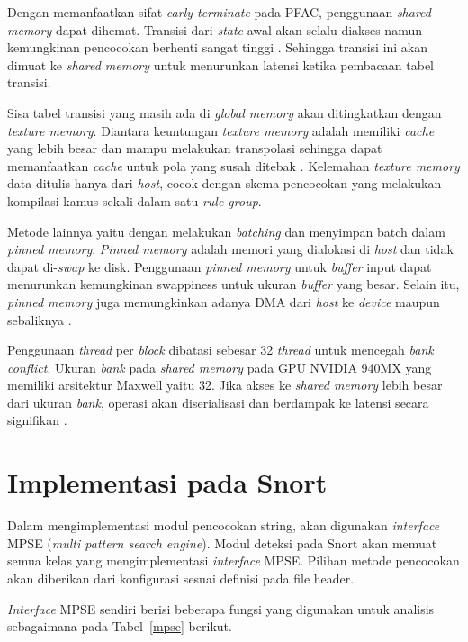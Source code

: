 \documentclass[conference]{IEEEtran}
\begin{document}
        Dengan memanfaatkan sifat \emph{early terminate} pada PFAC, penggunaan \emph{shared memory} dapat dihemat. Transisi dari \emph{state} awal akan selalu diakses namun kemungkinan pencocokan berhenti sangat tinggi \cite{lin2013}. Sehingga transisi ini akan dimuat ke \emph{shared memory} untuk menurunkan latensi ketika pembacaan tabel transisi.

        Sisa tabel transisi yang masih ada di \emph{global memory} akan ditingkatkan dengan \emph{texture memory}. Diantara keuntungan \emph{texture memory} adalah memiliki \emph{cache} yang lebih besar dan mampu melakukan transpolasi sehingga dapat memanfaatkan \emph{cache} untuk pola yang susah ditebak \cite{lin2013}. Kelemahan \emph{texture memory} data ditulis hanya dari \emph{host}, cocok dengan skema pencocokan yang melakukan kompilasi kamus sekali dalam satu \emph{rule group}.

        Metode lainnya yaitu dengan melakukan \emph{batching} dan menyimpan batch dalam \emph{pinned memory}. \emph{Pinned memory} adalah memori yang dialokasi di \emph{host} dan tidak dapat di-\emph{swap} ke disk. Penggunaan \emph{pinned memory} untuk \emph{buffer} input dapat menurunkan kemungkinan swappiness untuk ukuran \emph{buffer} yang besar. Selain itu, \emph{pinned memory} juga memungkinkan adanya DMA dari \emph{host} ke \emph{device} maupun sebaliknya \cite{gnort2008}.

        Penggunaan \emph{thread} per \emph{block} dibatasi sebesar 32 \emph{thread} untuk mencegah \emph{bank conflict}. Ukuran \emph{bank} pada \emph{shared memory} pada GPU NVIDIA 940MX yang memiliki arsitektur Maxwell yaitu 32. Jika akses ke \emph{shared memory} lebih besar dari ukuran \emph{bank}, operasi akan diserialisasi dan berdampak ke latensi secara signifikan \cite{lin2013}.

\section{Implementasi pada Snort}
    Dalam mengimplementasi modul pencocokan string, akan digunakan \emph{interface} MPSE (\emph{multi pattern search engine}). Modul deteksi pada Snort akan memuat semua kelas yang mengimplementasi \emph{interface} MPSE. Pilihan metode pencocokan akan diberikan dari konfigurasi sesuai definisi pada file header.

    \emph{Interface} MPSE sendiri berisi beberapa fungsi yang digunakan untuk analisis sebagaimana pada Tabel~\ref{mpse} berikut.
\end{document}
